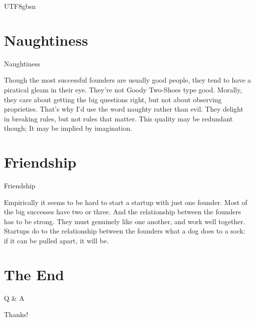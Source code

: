 \documentclass{beamer}
\begin{document}
\begin{CJK}{UTF8}{gbsn}
\section{Naughtiness}
\begin{frame}{Naughtiness}
  \begin{block}{Though the most successful founders are usually good people, they tend to have a piratical gleam in their eye. They're not Goody Two-Shoes type good. Morally, they care about getting the big questions right, but not about observing proprieties. That's why I'd use the word naughty rather than evil. They delight in breaking rules, but not rules that matter. This quality may be redundant though; It may be implied by imagination.}
  \end{block}
\end{frame}
\section{Friendship}
\begin{frame}{Friendship}
  \begin{block}{Empirically it seems to be hard to start a startup with just one founder. Most of the big successes have two or three. And the relationship between the founders has to be strong. They must genuinely like one another, and work well together. Startups do to the relationship between the founders what a dog does to a sock: if it can be pulled apart, it will be.}
  \end{block}
\end{frame}
\section{The End}
\begin{frame}{Q \& A}
\begin{center}
  \color{red}\LARGE{Thanks!}
\end{center}
\end{frame}
\end{CJK}
\end{document}
